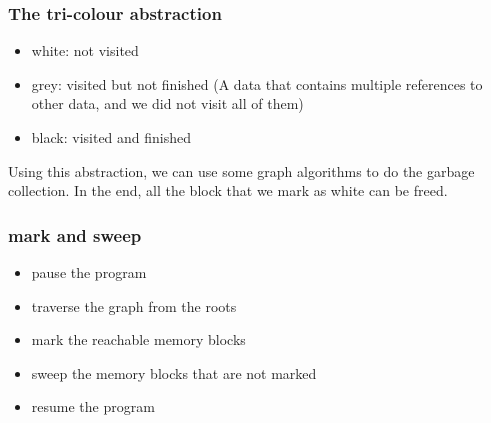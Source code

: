 \documentclass[letterpaper,12pt]{article}
\begin{document}
\subsubsection{The tri-colour abstraction}
\begin{itemize}
    \item white: not visited
    \item grey: visited but not finished (A data that contains multiple references to
          other data, and we did not visit all of them)
    \item black: visited and finished
\end{itemize}
Using this abstraction, we can use some graph algorithms to do the garbage collection. In the end, all the block that we mark as white can be freed.
\subsubsection{mark and sweep}
\begin{itemize}
    \item pause the program
    \item traverse the graph from the roots
    \item mark the reachable memory blocks
    \item sweep the memory blocks that are not marked
    \item resume the program
\end{itemize}
\end{document}
